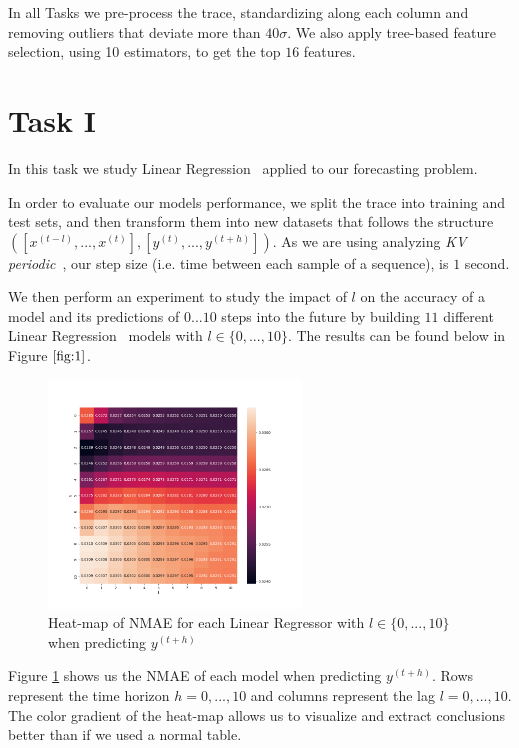 \documentclass[10pt]{article}
\begin{document}
In all Tasks we pre-process the trace, standardizing along each column and removing outliers that deviate more than $40\sigma$. We also apply tree-based feature selection, using 10 estimators, to get the top $16$ features.

\section*{Task I}
\label{sec:3}

In this task we study Linear Regression~\cite{LR} applied to our forecasting problem.

In order to evaluate our models performance, we split the trace into training and test sets, and then transform them into new datasets that follows the structure $([x^{(t-l)},...,x^{(t)}],[y^{(t)},...,y^{(t+h)}])$. As we are using analyzing \textit{KV periodic}~\cite{9012741}, our step size (i.e. time between each sample of a sequence), is $1$ second.

We then perform an experiment to study the impact of $l$ on the accuracy of a model and its predictions of $0...10$ steps into the future by building $11$ different Linear Regression~\cite{LR} models with $l\in\{0,...,10\}$. The results can be found below in Figure $\ref{fig:1}$.

\begin{figure}[!ht]
    \centering
    \includegraphics[width=0.6\textwidth,height=\textheight,keepaspectratio]{../result/project2/nmae_heatmap.png}
    \caption{Heat-map of \textsc{NMAE} for each Linear Regressor with $l\in\{0,...,10\}$ when predicting $y^{(t+h)}$}
    \label{fig:1}
\end{figure}

Figure \ref{fig:1} shows us the \textsc{NMAE} of each model when predicting $y^{(t+h)}$. Rows represent the time horizon $h = 0,...,10$ and columns represent the lag $l = 0,...,10$. The color gradient of the heat-map allows us to visualize and extract conclusions better than if we used a normal table.
\end{document}
